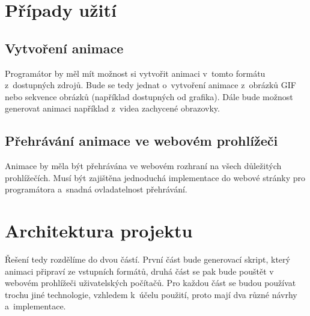 \section{Případy užití}

\subsection{Vytvoření animace}

Programátor by měl mít možnost si vytvořit animaci v~tomto formátu z~dostupných zdrojů. Bude se tedy jednat o~vytvoření animace z~obrázků GIF nebo sekvence obrázků (například dostupných od grafika). Dále bude možnost generovat animaci například z~videa zachycené obrazovky.

\subsection{Přehrávání animace ve webovém prohlížeči}

Animace by měla být přehrávána ve webovém rozhraní na všech důležitých prohlížečích. Musí být zajištěna jednoduchá implementace do webové stránky pro programátora a~snadná ovladatelnost přehrávání. 


\section{Architektura projektu}

Řešení tedy rozdělíme do dvou částí. První část bude generovací skript, který animaci připraví ze vstupních formátů, druhá část se pak bude pouštět v webovém prohlížeči uživatelských počítačů. Pro každou část se budou používat trochu jiné technologie, vzhledem k~účelu použití, proto mají dva různé návrhy a~implementace.




